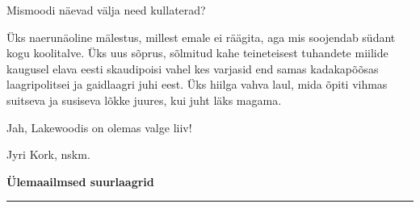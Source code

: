 \documentclass[12pt]{extbook}
\begin{document}
Mismoodi n\"aevad v\"alja need kullaterad?

\"Uks naerun\"aoline m\"alestus, millest emale ei r\"a\"agita, aga mis soojendab s\"udant kogu koolitalve.  \"Uks uus s\~oprus, s\~olmitud kahe teineteisest tuhandete miilide kaugusel elava eesti skaudipoisi vahel kes varjasid end samas kadakap\~o\~osas laagripolitsei ja gaidlaagri juhi eest.  \"Uks hiilga vahva laul, mida \~opiti vihmas suitseva ja susiseva l\~okke juures, kui juht l\"aks magama.

Jah, Lakewoodis on olemas valge liiv!

\hfill
Jyri Kork, nskm.

\cleardoublepage
{\samepage\raggedbottom
\raggedright
\sloppy
\centerline{ {\bf {\large \"Ulemaailmsed suurlaagrid}}}
\vspace{0.1in}
\hrule height 0.05ex}
\end{document}
